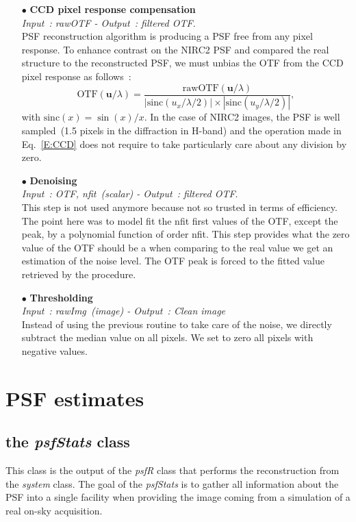 \documentclass[12pt]{article}
\begin{document}
\begin{itemize}
	\item[$\bullet$] \textbf{CCD pixel response compensation}\\
	\emph{Input~: rawOTF - Output~: filtered OTF}.\\
	PSF reconstruction algorithm is producing a PSF free from any pixel response. To enhance contrast on the NIRC2 PSF and compared the real structure to the reconstructed PSF, we must unbias the OTF from the CCD pixel response as follows~:	
	\begin{equation} \label{E:CCD}
		\text{OTF}(\boldsymbol{u}/\lambda) = \dfrac{\text{rawOTF}(\boldsymbol{u}/\lambda)}{|\text{sinc}(u_x/\lambda/2)|\times |\text{sinc}(u_y/\lambda/2)|},
	\end{equation}
	with $\text{sinc}(x) = \sin(x)/x$. In the case of NIRC2 images, the PSF is well sampled~(1.5 pixels in the diffraction in H-band) and the operation made in Eq.~\ref{E:CCD} does not require to take particularly care about any division by zero.
	
	\item[$\bullet$] \textbf{Denoising}\\
	\emph{Input~: OTF, nfit~(scalar) - Output~: filtered OTF}.\\
	This step is not used anymore because not so trusted in terms of efficiency. The point here was to model fit the nfit first values of the OTF, except the peak, by a polynomial function of order nfit. This step provides what the zero value of the OTF should be a when comparing to the real value we get an estimation of the noise level. The OTF peak is forced to the fitted value retrieved by the procedure.
	
	\item[$\bullet$] \textbf{Thresholding}\\
	\emph{Input~: rawImg~(image) - Output~: Clean image}\\
	 Instead of using the previous routine to take care of the noise, we directly subtract the median value on all pixels. We set to zero all pixels with negative values.
\end{itemize}


\section{PSF estimates}
\subsection{the \emph{psfStats} class}
This class is the output of the \emph{psfR} class that performs the reconstruction from the \emph{system} class. The goal of the \emph{psfStats} is to gather all information about the PSF into a single facility when providing the image coming from a simulation of a real on-sky acquisition.\\
\end{document}
